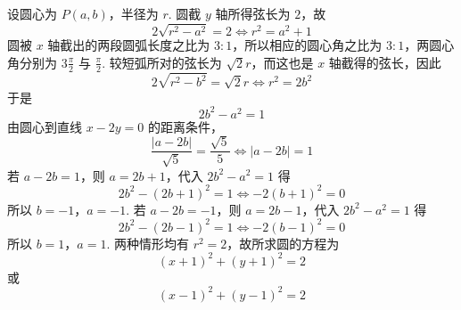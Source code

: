 \documentclass[UTF8,a4paper,oneside,11pt]{ctexbook}
\begin{document}
\begin{solution}
设圆心为 \(P(a,b)\)，半径为 \(r\). 圆截 \(y\) 轴所得弦长为 \(2\)，故
\[
2\sqrt{r^2-a^2}=2
\iff r^2=a^2+1
\]
圆被 \(x\) 轴截出的两段圆弧长度之比为 \(3:1\)，所以相应的圆心角之比为 \(3:1\)，两圆心角分别为 \(3\frac{\pi}{2}\) 与 \(\frac{\pi}{2}\). 较短弧所对的弦长为 \(\sqrt2r\)，而这也是 \(x\) 轴截得的弦长，因此
\[
2\sqrt{r^2-b^2}=\sqrt2r
\iff r^2=2b^2
\]
于是
\[
2b^2-a^2=1
\]
由圆心到直线 \(x-2y=0\) 的距离条件，
\[
\frac{|a-2b|}{\sqrt5}=\frac{\sqrt5}{5}
\iff |a-2b|=1
\]
若 \(a-2b=1\)，则 \(a=2b+1\)，代入 \(2b^2-a^2=1\) 得
\[
2b^2-(2b+1)^2=1
\iff -2(b+1)^2=0
\]
所以 \(b=-1\)，\(a=-1\). 若 \(a-2b=-1\)，则 \(a=2b-1\)，代入 \(2b^2-a^2=1\) 得
\[
2b^2-(2b-1)^2=1
\iff -2(b-1)^2=0
\]
所以 \(b=1\)，\(a=1\). 两种情形均有 \(r^2=2\)，故所求圆的方程为
\[
(x+1)^2+(y+1)^2=2
\]
或
\[
(x-1)^2+(y-1)^2=2
\]
\end{solution}

\end{document}
